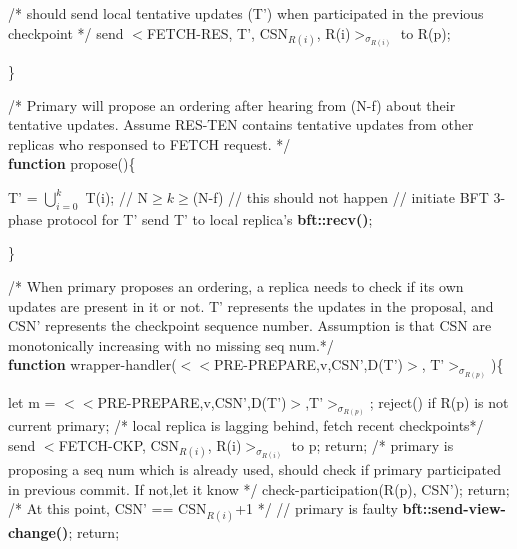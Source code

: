 \documentclass[twocolumn,10pt]{article}
\begin{document}
{\begin{algorithm}
\begin{algorithmic}[1]
\STATE /* should send local tentative updates (T') when participated
in the previous checkpoint */
\STATE send $<$FETCH-RES, T', CSN$_{R(i)}$, R(i)$>_{\sigma_{R(i)}}$ to R(p);
\ENDIF
\ENDIF
\end{algorithmic}
\}\\
\end{algorithm}
\begin{algorithm}
/* Primary will propose an ordering after hearing from (N-f)
about their tentative updates. Assume RES-TEN contains tentative
updates from other replicas who responsed to FETCH request. */\\
\textbf{function} propose()\{
\begin{algorithmic}[1]
\STATE T' = $\bigcup_{i=0}^{k}$ T(i); // N$\ge k \ge$(N-f)
\STATE // this should not happen
\ENDIF
\STATE // initiate BFT 3-phase protocol for T'
\STATE send T' to local replica's \textbf{bft::recv()};
\ENDIF
\end{algorithmic}
\}\\
\end{algorithm}
\begin{algorithm}
/* When primary proposes an ordering, a replica needs to check 
 if its own updates are present in it or not. T' represents
 the updates in the proposal, and CSN' represents the checkpoint
 sequence number. Assumption is that CSN are monotonically increasing
 with no missing seq num.*/\\
\textbf{function} wrapper-handler($<<$PRE-PREPARE,v,CSN',D(T')$>$, T'$>_{\sigma_{R(p)}}$)\{
\begin{algorithmic}[1]
\STATE let m = $<<$PRE-PREPARE,v,CSN',D(T')$>$,T'$>_{\sigma_{R(p)}}$;
\STATE reject() if R(p) is not current primary;
\STATE /* local replica is lagging behind, fetch recent checkpoints*/
\STATE send $<$FETCH-CKP, CSN$_{R(i)}$, R(i)$>_{\sigma_{R(i)}}$ to p;
\STATE return;
\STATE /* primary is proposing a seq num which is already used, should check if 
primary participated in previous commit. If not,let it know */
\STATE check-participation(R(p), CSN');
\STATE return;
\ENDIF
\STATE /* At this point, CSN' == CSN$_{R(i)}$+1 */
\STATE // primary is faulty
\STATE \textbf{bft::send-view-change()};
\STATE return;
\ENDIF
{}

\end{algorithmic}
\end{algorithm}}
\end{document}
